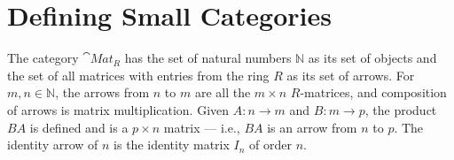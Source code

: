 \chapter{Defining Small Categories}\label{chap:DefSmallCats}

\begin{Example}\label{ex:Mat}
The category $\cat{Mat}_{R}$ has the set of natural numbers $\mathbb N$ as its set of objects and the set of all matrices with entries from the ring $R$ as its set of arrows. For $m, n \in \mathbb N$, the arrows from $n$ to $m$ are all the $m \times n$ $R$-matrices, and composition of arrows is matrix multiplication. Given $A \colon n \to m$ and $B \colon m \to p$, the product $BA$ is defined and is a $p \times n$ matrix --- i.e., $BA$ is an arrow from $n$ to $p$. The identity arrow of $n$ is the identity matrix $I_n$ of order $n$.
\end{Example}